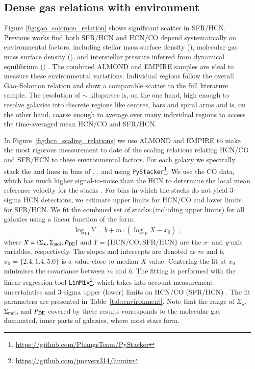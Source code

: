 \documentclass[letter, longauth]{aa} %
\begin{document}
\subsection{Dense gas relations with environment}
\label{sec:environment_relations}

Figure \ref{fig:gao_solomon_relation} shows significant scatter in SFR/HCN. Previous works find both SFR/HCN and HCN/CO depend systematically on environmental factors, including stellar mass surface density (\sigstar ), molecular gas mass surface density (\sigmol ), and interstellar pressure inferred from dynamical equilibrium (\pde ) \citep{Usero2015, Gallagher2018a, Jimenez-Donaire2019}. The combined ALMOND and EMPIRE samples are ideal to measure these environmental variations. 
Individual regions follow the overall Gao--Solomon relation and show a comparable scatter to the full literature sample. The resolution of $\sim$ kiloparsec is, on the one hand, high enough to resolve galaxies into discrete regions like centres, bars and spiral arms and is, on the other hand, coarse enough to average over many individual regions to access the time-averaged mean HCN/CO and SFR/HCN.

In Figure~\ref{fig:hcn_scaling_relations} we use ALMOND and EMPIRE to make the most rigorous measurement to date of the scaling relations relating HCN/CO and SFR/HCN to these environmental factors. For each galaxy we spectrally stack the \hcnone and \coone lines in bins of \sigstar, \sigmol, and \pde using \texttt{PyStacker}\footnote{\url{https://github.com/PhangsTeam/PyStacker}}. We use the CO data, which has much higher signal-to-noise than the HCN to determine the local mean reference velocity for the stacks \citep[see][and references therein for details on the spectral stacking methodology; Appendix~\ref{sec:app:stacking} presents the spectral stacks of HCN and CO]{Neumann2023b}. 
For bins in which the stacks do not yield 3-sigma HCN detections, we estimate upper limits for HCN/CO and lower limits for SFR/HCN. 
We fit the combined set of stacks (including upper limits) for all galaxies using a linear function of the form:
\begin{align}
	\log_{10} Y = b + m \cdot (\log_{10} X - x_0)\;,
    \label{equ:fit_function}
\end{align}
where $X=\{\Sigma_{\star}, \Sigma_{\text{mol}}, P_{\text{DE}}\}$ and $Y=\{\mathrm{HCN/CO}, \mathrm{SFR/HCN}\}$ are the $x$- and $y$-axis variables, respectively. 
The slopes and intercepts are denoted as $m$ and $b$, $x_0=\{2.4, 1.4, 5.0\}$ is a value close to median $X$ value. 
Centering the fit at $x_0$ minimises the covariance between $m$ and $b$. The fitting is performed with the linear regression tool \texttt{LinMix}\footnote{\url{https://github.com/jmeyers314/linmix}}, which takes into account measurement uncertainties and 3-sigma upper (lower) limits on HCN/CO (SFR/HCN) \citep[see e.g.][for more details on the fitting routine]{Neumann2023a}.
The fit parameters are presented in Table~\ref{tab:environment}. Note that the range of $\Sigma_\star$, $\Sigma_{\rm mol}$, and $P_{\rm DE}$ covered by these results corresponds to the molecular gas dominated, inner parts of galaxies, where most stars form.
\end{document}
